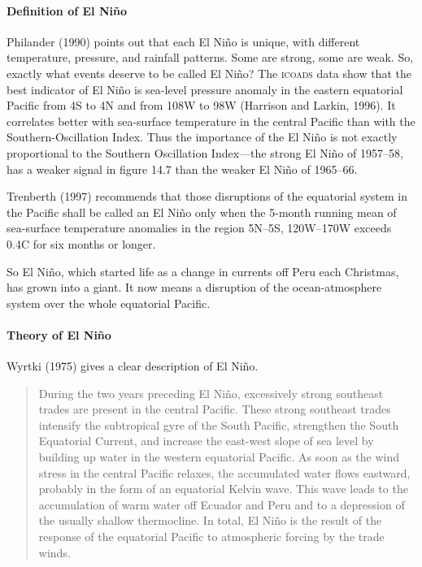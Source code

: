 \paragraph{Definition of El Ni\~{n}o}
Philander (1990) points out that each El Ni\~{n}o is unique, with different temperature, pressure, and rainfall patterns. Some are strong, some are weak. So, exactly what events deserve to be called El Ni\~{n}o? The \textsc{icoads} data show that the best indicator of El Ni\~{n}o is sea-level pressure anomaly in the eastern equatorial Pacific from 4\degrees S to 4\degrees N and from 108\degrees W to 98\degrees W (Harrison and Larkin, 1996). It correlates better with sea-surface temperature in the central Pacific than with the Southern-Oscillation Index. Thus the importance of the El Ni\~{n}o is not exactly proportional to the Southern Oscillation Index---the strong El Ni\~{n}o of 1957--58, has a weaker signal in figure 14.7 than the weaker El Ni\~{n}o of 1965--66.

Trenberth (1997) recommends that those disruptions of the equatorial system in the Pacific shall be called an El Ni\~{n}o only when the 5-month running mean of sea-surface temperature anomalies in the region 5\degrees N--5\degrees S, 120\degrees W--170\degrees W exceeds 0.4\degrees C for six months or longer.

So  El Ni\~{n}o, which started life as a change in currents off Peru each Christmas, has grown into a giant. It now means a disruption of the ocean-atmosphere system over the whole equatorial Pacific.

\paragraph{Theory of El Ni\~{n}o}
Wyrtki (1975) gives a clear description of El Ni\~{n}o.
\begin{quote} \small
During the two years preceding El Ni\~{n}o, excessively strong southeast
trades are present in the central Pacific. These strong southeast trades
intensify the subtropical gyre of the South Pacific, strengthen the South
Equatorial Current, and increase the east-west slope of sea level by building
up water in the western equatorial Pacific. As soon as the wind
stress in the central Pacific relaxes, the accumulated water
flows eastward, probably in the form of an equatorial Kelvin
wave. This wave leads to the accumulation of warm water
off Ecuador and Peru and to a depression of the usually shallow
thermocline. In total, El Ni\~{n}o is the result of the response
of the equatorial Pacific to atmospheric forcing by the trade winds.
\end{quote}

